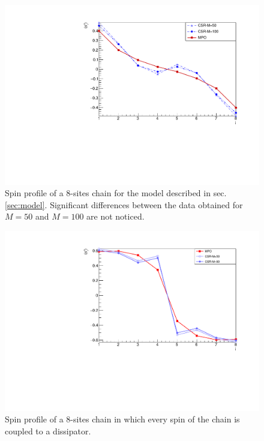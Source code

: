 \begin{figure}[H]
    \centering
    \includegraphics[scale=0.7]{Figures/8sites/1U1D_comparisonCSR_MPO_8site.pdf}
    \caption{Spin profile of a 8-sites chain for the model described in sec.\ref{sec:model}. Significant differences between the data obtained for $M=50$ and $M=100$ are not noticed.}
    \label{fig:1U1D_comparisonCSR_MPO_8site}
\end{figure}

\begin{figure}[H]
    \centering
    \includegraphics[scale=0.7]{Figures/8sites/8sites_MPOvsCORNER_4U4D.pdf}
    \caption{Spin profile of a 8-sites chain in which every spin of the chain is coupled to a dissipator.}
    \label{fig:8sites_MPOvsCORNER_4U4D}
\end{figure}

